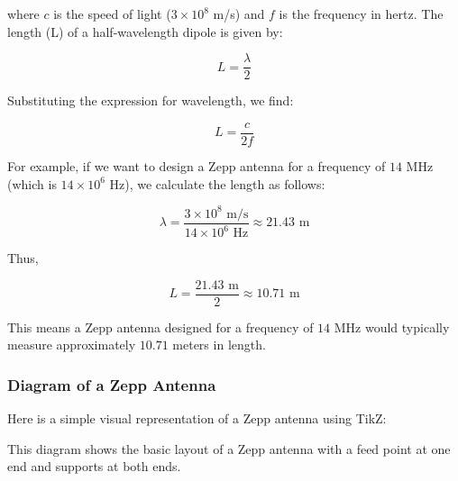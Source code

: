where \(c\) is the speed of light (\(3 \times 10^8\) m/s) and \(f\) is the frequency in hertz. The length (L) of a half-wavelength dipole is given by:

\[
L = \frac{\lambda}{2}
\]

Substituting the expression for wavelength, we find:

\[
L = \frac{c}{2f}
\]

For example, if we want to design a Zepp antenna for a frequency of \(14\) MHz (which is \(14 \times 10^6\) Hz), we calculate the length as follows:

\[
\lambda = \frac{3 \times 10^8 \text{ m/s}}{14 \times 10^6 \text{ Hz}} \approx 21.43 \text{ m}
\]

Thus,

\[
L = \frac{21.43 \text{ m}}{2} \approx 10.71 \text{ m}
\]

This means a Zepp antenna designed for a frequency of \(14\) MHz would typically measure approximately \(10.71\) meters in length.

\subsubsection{Diagram of a Zepp Antenna}
Here is a simple visual representation of a Zepp antenna using TikZ:

\begin{center}
\end{center}

This diagram shows the basic layout of a Zepp antenna with a feed point at one end and supports at both ends.
